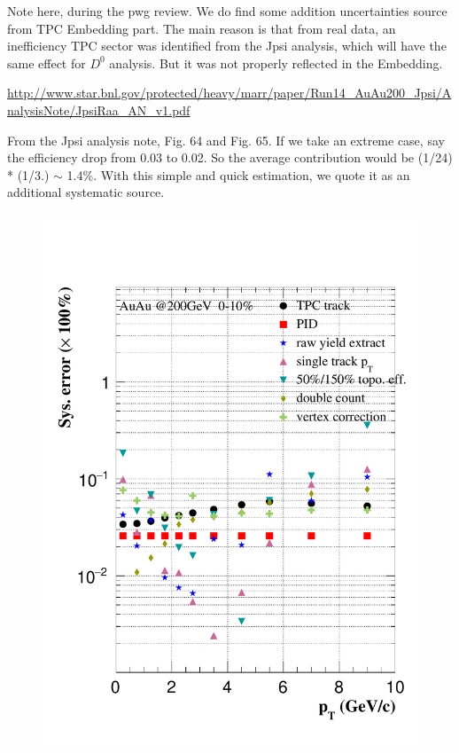 Note here, during the pwg review. We do find some addition uncertainties source from TPC Embedding part. The main reason is that from real data, an inefficiency TPC sector was identified from the Jpsi analysis, which will have the same effect for $D^0$ analysis. But it was not properly reflected in the Embedding. 

\url{http://www.star.bnl.gov/protected/heavy/marr/paper/Run14_AuAu200_Jpsi/AnalysisNote/JpsiRaa_AN_v1.pdf}

From the Jpsi analysis note, Fig. 64 and Fig. 65. If we take an extreme case, say the efficiency drop from 0.03 to 0.02. So the average contribution would be (1/24) * (1/3.) $\sim$ 1.4\%. With this simple and quick estimation, we quote it as an additional systematic source.

\begin{figure}[htbp]
\begin{minipage}[htbp]{0.47\linewidth}
\centering
\includegraphics[width=1.0\textwidth,angle=0]{figure/Run14_D0HFT/sysErr_0_10_2.pdf}

\end{minipage}
\end{figure}

